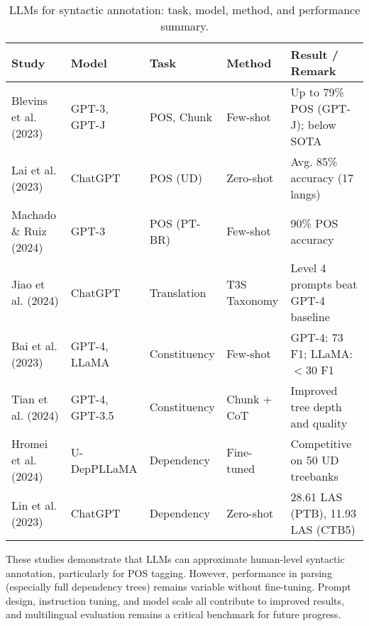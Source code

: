 \begin{table}[ht]
\centering
\begin{tabular}{p{3.3cm} p{2cm} p{2cm} p{2.5cm} p{3.5cm}}
\toprule
\textbf{Study} & \textbf{Model} & \textbf{Task} & \textbf{Method} & \textbf{Result / Remark} \\
\midrule
Blevins et al. (2023) & GPT-3, GPT-J & POS, Chunk & Few-shot & Up to 79\% POS (GPT-J); below SOTA \\
Lai et al. (2023) & ChatGPT & POS (UD) & Zero-shot & Avg. 85\% accuracy (17 langs) \\
Machado \& Ruiz (2024) & GPT-3 & POS (PT-BR) & Few-shot & 90\% POS accuracy \\
Jiao et al. (2024) & ChatGPT & Translation & T3S Taxonomy & Level 4 prompts beat GPT-4 baseline \\
Bai et al. (2023) & GPT-4, LLaMA & Constituency & Few-shot & GPT-4: 73 F1; LLaMA: $<$30 F1 \\
Tian et al. (2024) & GPT-4, GPT-3.5 & Constituency & Chunk + CoT & Improved tree depth and quality \\
Hromei et al. (2024) & U-DepPLLaMA & Dependency & Fine-tuned & Competitive on 50 UD treebanks \\
Lin et al. (2023) & ChatGPT & Dependency & Zero-shot & 28.61 LAS (PTB), 11.93 LAS (CTB5) \\
\bottomrule
\end{tabular}
\caption{LLMs for syntactic annotation: task, model, method, and performance summary.}
\label{tab:llm_syntax}
\end{table}

These studies demonstrate that LLMs can approximate human-level syntactic annotation, particularly for POS tagging. However, performance in parsing (especially full dependency trees) remains variable without fine-tuning. Prompt design, instruction tuning, and model scale all contribute to improved results, and multilingual evaluation remains a critical benchmark for future progress.


